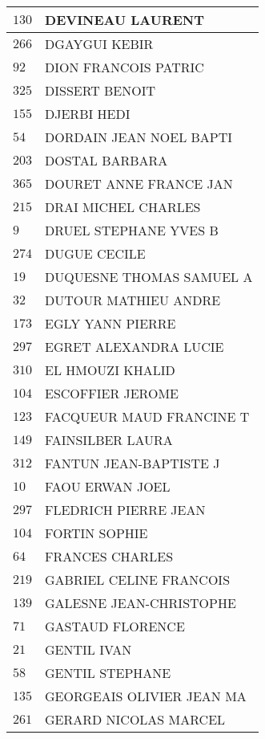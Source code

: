 \begin{xltabular}{\linewidth}{|l|X|}
    \hline
    $130$ & DEVINEAU LAURENT \\
    \hline
    $266$ & DGAYGUI KEBIR \\
    \hline
    $92$ & DION FRANCOIS PATRIC \\
    \hline
    $325$ & DISSERT BENOIT \\
    \hline
    $155$ & DJERBI HEDI \\
    \hline
    $54$ & DORDAIN JEAN NOEL BAPTI \\
    \hline
    $203$ & DOSTAL BARBARA \\
    \hline
    $365$ & DOURET ANNE FRANCE JAN \\
    \hline
    $215$ & DRAI MICHEL CHARLES \\
    \hline
    $9$ & DRUEL STEPHANE YVES B \\
    \hline
    $274$ & DUGUE CECILE \\
    \hline
    $19$ & DUQUESNE THOMAS SAMUEL A \\
    \hline
    $32$ & DUTOUR MATHIEU ANDRE \\
    \hline
    $173$ & EGLY YANN PIERRE \\
    \hline
    $297$ & EGRET ALEXANDRA LUCIE \\
    \hline
    $310$ & EL HMOUZI KHALID \\
    \hline
    $104$ & ESCOFFIER JEROME \\
    \hline
    $123$ & FACQUEUR MAUD FRANCINE T \\
    \hline
    $149$ & FAINSILBER LAURA \\
    \hline
    $312$ & FANTUN JEAN-BAPTISTE J \\
    \hline
    $10$ & FAOU ERWAN JOEL \\
    \hline
    $297$ & FLEDRICH PIERRE JEAN \\
    \hline
    $104$ & FORTIN SOPHIE \\
    \hline
    $64$ & FRANCES CHARLES \\
    \hline
    $219$ & GABRIEL CELINE FRANCOIS \\
    \hline
    $139$ & GALESNE JEAN-CHRISTOPHE \\
    \hline
    $71$ & GASTAUD FLORENCE \\
    \hline
    $21$ & GENTIL IVAN \\
    \hline
    $58$ & GENTIL STEPHANE \\
    \hline
    $135$ & GEORGEAIS OLIVIER JEAN MA \\
    \hline
    $261$ & GERARD NICOLAS MARCEL \\

\end{xltabular}
